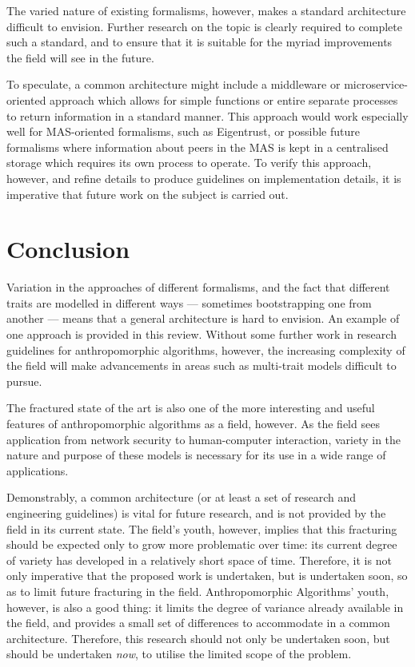 \documentclass[11pt,english,twocolumn]{article}
\begin{document}
The varied nature of existing formalisms, however, makes a standard architecture difficult to envision. Further research on the topic is clearly required to complete such a standard, and to ensure that it is suitable for the myriad improvements the field will see in the future.\par

To speculate, a common architecture might include a middleware or microservice-oriented approach which allows for simple functions or entire separate processes to return information in a standard manner. This approach would work especially well for MAS-oriented formalisms, such as Eigentrust, or possible future formalisms where information about peers in the MAS is kept in a centralised storage which requires its own process to operate. To verify this approach, however, and refine details to produce guidelines on implementation details, it is imperative that future work on the subject is carried out.\par

\section{Conclusion}
Variation in the approaches of different formalisms, and the fact that different traits are modelled in different ways --- sometimes bootstrapping one from another --- means that a general architecture is hard to envision. An example of one approach is provided in this review. Without some further work in research guidelines for anthropomorphic algorithms, however, the increasing complexity of the field will make advancements in areas such as multi-trait models difficult to pursue.\par

The fractured state of the art is also one of the more interesting and useful features of anthropomorphic algorithms as a field, however. As the field sees application from network security to human-computer interaction, variety in the nature and purpose of these models is necessary for its use in a wide range of applications.\par

Demonstrably, a common architecture (or at least a set of research and engineering guidelines) is vital for future research, and is not provided by the field in its current state. The field's youth, however, implies that this fracturing should be expected only to grow more problematic over time: its current degree of variety has developed in a relatively short space of time. Therefore, it is not only imperative that the proposed work is undertaken, but is undertaken soon, so as to limit future fracturing in the field. Anthropomorphic Algorithms' youth, however, is also a good thing: it limits the degree of variance already available in the field, and provides a small set of differences to accommodate in a common architecture. Therefore, this research should not only be undertaken soon, but should be undertaken \emph{now}, to utilise the limited scope of the problem.





\let\oldbibliography\thebibliography{}
\renewcommand{\thebibliography}[1]{\oldbibliography{#1}
\setlength{\itemsep}{-3pt}}


{
\scriptsize

}
\end{document}
